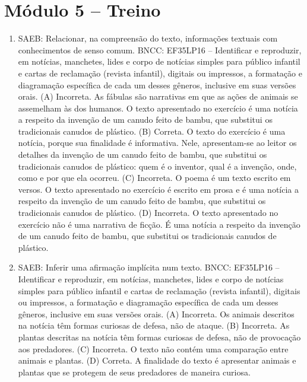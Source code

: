 \section*{Módulo 5 – Treino}

\begin{enumerate}
\item
SAEB: Relacionar, na compreensão do texto, informações textuais com
conhecimentos de senso comum.
BNCC: EF35LP16 -- Identificar e reproduzir, em notícias, manchetes, lides
e corpo de notícias simples para público infantil e cartas de reclamação
(revista infantil), digitais ou impressos, a formatação e diagramação
específica de cada um desses gêneros, inclusive em suas versões orais.
(A) Incorreta. As fábulas são narrativas em que as ações de animais se 
assemelham às dos humanos. O texto apresentado no exercício é uma notícia 
a respeito da invenção de um canudo feito de bambu, que substitui os 
tradicionais canudos de plástico.  
(B) Correta. O texto do exercício é uma notícia, porque sua finalidade é
informativa. Nele, apresentam-se ao leitor os detalhes da invenção de um 
canudo feito de bambu, que substitui os tradicionais canudos de plástico:
quem é o inventor, qual é a invenção, onde, como e por que ela ocorreu.
(C) Incorreta. O poema é um texto escrito em versos. O texto apresentado 
no exercício é escrito em prosa e é uma notícia a respeito da invenção de
um canudo feito de bambu, que substitui os tradicionais canudos de 
plástico.   
(D) Incorreta. O texto apresentado no exercício não é uma narrativa de 
ficção. É uma notícia a respeito da invenção de um canudo feito de bambu,
que substitui os tradicionais canudos de plástico.

\item
SAEB: Inferir uma afirmação implícita num texto.
BNCC: EF35LP16 -- Identificar e reproduzir, em notícias, manchetes, lides
e corpo de notícias simples para público infantil e cartas de reclamação
(revista infantil), digitais ou impressos, a formatação e diagramação
específica de cada um desses gêneros, inclusive em suas versões orais.
(A) Incorreta. Os animais descritos na notícia têm formas curiosas de 
defesa, não de ataque. 
(B) Incorreta. As plantas descritas na notícia têm formas curiosas de 
defesa, não de provocação aos predadores. 
(C) Incorreta. O texto não contém uma comparação entre animais e plantas.  
(D) Correta. A finalidade do texto é apresentar animais e plantas que se 
protegem de seus predadores de maneira curiosa.


\end{enumerate}
